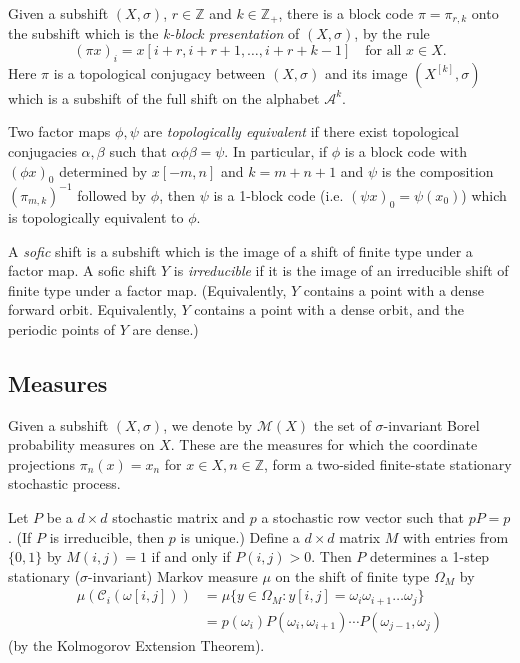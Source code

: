 \documentclass{kepart2010}
\theoremstyle{plain}
\theoremstyle{definition}
\theoremstyle{remark}
\theoremstyle{definition}
\numberwithin{equation}{section}
\begin{document}
Given  a subshift $(X,\sigma)$,
$r\in \mathbb Z$ and $k \in \mathbb Z_+ $,
there is
a block code $\pi=\pi_{r,k}$ onto
the subshift which is
the
{\it k-block presentation} of $(X,\sigma )$,
 by the rule
\begin{equation} (\pi x)_i = x[i+r,i+r+1,\dots ,i+r+k-1] \quad\text{for all } x
\in X. \end{equation} Here  $\pi$ is a topological conjugacy between
$(X,\sigma)$ and its image $(X^{[k]},\sigma)$ which is a subshift of
the full shift on the alphabet ${{\mathcal A}}^k$.

Two factor maps $\phi, \psi$ are {\it topologically equivalent} if
there exist topological conjugacies $\alpha, \beta$ such that
$\alpha \phi \beta = \psi $. In particular, if $\phi$ is a block
code with $(\phi x)_0$ determined by $x[-m,n]$ and $k=m+n+1$ and
$\psi$ is the composition $(\pi_{m,k})^{-1}$ followed by $\phi$,
then
$\psi$ is a 1-block code (i.e. $(\psi x)_0 = \psi (x_0)$) which is
topologically equivalent to $\phi$.

A {\em sofic} shift is a subshift which is the image of a shift of
finite type under a factor map.
A sofic shift $Y$ is {\em irreducible} if it is the image of an
irreducible shift of finite type under a factor map.
(Equivalently, $Y$ contains a point with a dense forward orbit.
Equivalently, $Y$ contains a point with a dense orbit, and the
periodic points of $Y$ are dense.)

\subsection{Measures}\label{sec_measures}

Given a subshift $(X,\sigma)$, we denote by ${{\mathcal M}} (X)$ the set of
$\sigma$-invariant Borel probability measures on $X$. These are the
measures for which the coordinate projections $\pi_n(x)=x_n$ for $x
\in X, n \in {\mathbb Z}$, form a two-sided finite-state stationary
stochastic process.

Let $P$ be a {}{ $d \times d$  stochastic} matrix and $p$ {}{a}
 stochastic row vector such that $pP=p$.
{}{(If $P$ is irreducible, then $p$ is unique.)} Define a $d \times
d$ matrix $M$ with entries from $\{ 0,1\}$ by $M(i,j)=1$ if and only
if $P(i,j)>0$. Then $P$ determines a 1-step stationary
($\sigma$-invariant) Markov measure $\mu$ on the shift of finite
type $\Omega_M$ by
 \begin{equation}
 \begin{aligned}
 \mu({{\mathcal C}}_i(\omega[i,j]))&=\mu\{y \in \Omega_M:y[i,j]=\omega_i\omega_{i+1}\dots \omega_j\}\\
 &=p(\omega_i)P(\omega_i,\omega_{i+1}) \cdots P(\omega_{j-1},\omega_j)
 \end{aligned}
 \end{equation}
 (by the Kolmogorov Extension Theorem).
\end{document}
